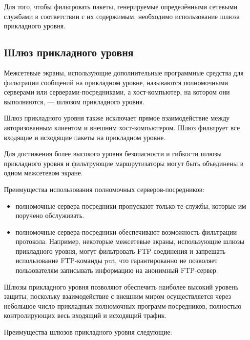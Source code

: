 Для того, чтобы фильтровать пакеты, генерируемые определёнными
сетевыми службами в соответствии с их содержимым, необходимо
использование шлюза прикладного уровня.

\subsection{Шлюз прикладного уровня }
Межсетевые экраны, использующие дополнительные программные средства
для фильтрации сообщений на прикладном уровне, называются полномочными
серверами или серверами-посредниками, а хост-компьютер, на котором они
выполняются, --- шлюзом прикладного уровня.

Шлюз прикладного уровня также исключает прямое взаимодействие между
авторизованным клиентом и внешним хост-компьютером. Шлюз фильтрует все
входящие и исходящие пакеты на прикладном уровне.

Для достижения более высокого уровня безопасности и гибкости шлюзы
прикладного уровня и фильтрующие маршрутизаторы могут быть объединены
в одном межсетевом экране.

Преимущества использования полномочных серверов-посредников:

\begin{itemize}
\item полномочные сервера-посредники пропускают только те
    службы, которые им поручено обслуживать.
\item полномочные сервера-посредники обеспечивают возможность
    фильтрации протокола. Например, некоторые межсетевые экраны,
    использующие шлюзы прикладного уровня, могут фильтровать
    FTP-соединения и запрещать использование FTP-команды put, что
    гарантированно не позволяет пользователям записывать информацию на
    анонимный FTP-сервер.
\end{itemize}

Шлюзы прикладного уровня позволяют обеспечить наиболее высокий уровень
защиты, поскольку взаимодействие с внешним миром осуществляется через
небольшое число прикладных полномочных программ-посредников, полностью
контролирующих весь входящий и исходящий трафик.

Преимущества шлюзов прикладного уровня следующие:

